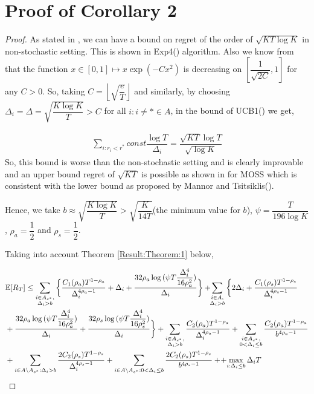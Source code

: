 \section{Proof of Corollary 2}
\label{App:Proof:Corollary:2}
\begin{proof}
As stated in \cite{auer2010ucb}, we can have a bound on regret of the order of $\sqrt{KT\log K}$ in non-stochastic setting. This is shown in Exp4(\cite{auer2002nonstochastic}) algorithm. Also we know from \cite{bubeck2011pure} that the function $x\in [0,1]\mapsto x\exp(-Cx^2)$ is  decreasing on $\left[\dfrac{1}{\sqrt{2C}},1\right ]$ for any $C>0$. So, taking $C=\left\lfloor \sqrt{\dfrac{e}{T}}\right\rfloor$ and similarly, by choosing  $\Delta_{i}=\Delta=\sqrt{\dfrac{K\log K}{T}}> C$ for all ${i:i\neq *}\in A$, in the bound of UCB1(\cite{auer2002finite}) we get,

\begin{align*}
\sum_{i:r_{i}<r^{*}}const \dfrac{\log T}{\Delta_{i}}=\dfrac{\sqrt{KT}\log T}{\sqrt{\log K}}
\end{align*}
So, this bound is worse than the non-stochastic setting and is clearly improvable and an upper bound regret of $\sqrt{KT}$ is possible as shown in \cite{audibert2009minimax} for MOSS which is consistent with the lower bound as proposed by Mannor and Tsitsiklis(\cite{mannor2004sample}).

	Hence, we take $b\approx\sqrt{\dfrac{K\log K}{T}} > \sqrt{\dfrac{K}{14 T}}$(the minimum value for $b$), $\psi=\dfrac{T}{196 \log K}$, $\rho_{a}=\dfrac{1}{2}$ and $\rho_{s}=\dfrac{1}{2}$.
	
	Taking into account Theorem \ref{Result:Theorem:1} below, 
	
\begin{align*}
&\mathbb{E} [R_{T}]\leq 
\sum\limits_{\substack{i\in A_{s^{*}},\\\Delta_{i} > b}}\bigg\lbrace \dfrac{C_1(\rho_{a})T^{1-\rho_{a}}}{\Delta_{i}^{4\rho_{a}-1}} + \Delta_{i}
 + \frac{32\rho_{a}\log{(\psi T\dfrac{\Delta_{i}^{4}}{16\rho_{a}^{2}})}}{\Delta_{i}} \bigg\rbrace
 + \! \! \sum\limits_{\substack{i\in A,\\\Delta_{i} > b}} \bigg\lbrace 2\Delta_{i}+
\dfrac{C_1(\rho_{s})T^{1-\rho_{s}}}{\Delta_{i}^{4\rho_{s}-1}} \\
&+ \frac{32\rho_{a}\log{(\psi T\dfrac{\Delta_{i}^{4}}{16\rho_{a}^{2}})}}{\Delta_{i}} 
+ \dfrac{32\rho_{s}\log{(\psi T\dfrac{\Delta_{i}^{4}}{16\rho_{s}^{2}})}}{\Delta_{i}}\bigg\rbrace 
+ \sum\limits_{\substack{i\in A_{s^{*}},\\ \Delta_{i} > b}} 
\frac{C_2(\rho_{a})T^{1-\rho_{a}}}{\Delta_{i}^{4\rho_{a}-1}}
+\sum\limits_{\substack{i\in A_{s^{*}},\\0 < \Delta_{i}\leq b}}\frac{C_2(\rho_a)T^{1-\rho_{a}}}{b^{4\rho_{a} -1}}\\ 
 & + \sum_{i\in A\setminus A_{s^*}: \Delta_{i} > b}\dfrac{2C_{2}(\rho_{s})T^{1-\rho_{s}}}{\Delta_{i}^{4\rho_{s}-1}} +\sum_{i\in A\setminus A_{s^*}: 0 < \Delta_{i} \leq b}\dfrac{2C_{2}(\rho_{s})T^{1-\rho_{s}}}{b^{4\rho_{s}-1}} +
 \!+\! \max\limits_{i:\Delta_{i}\leq b}\Delta_{i}T
\end{align*}


\end{proof}
